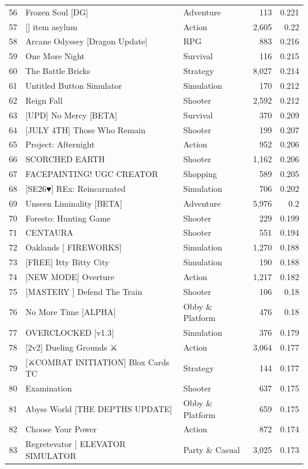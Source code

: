 \documentclass[10pt]{article}
\begin{document}
\begin{longtable}{r l l r r}
56 & Frozen Soul [DG] & Adventure & 113 & 0.221 \\
57 & [] item asylum & Action & 2,605 & 0.22 \\
58 & Arcane Odyssey [Dragon Update] & RPG & 883 & 0.216 \\
59 & One More Night & Survival & 116 & 0.215 \\
60 & The Battle Bricks & Strategy & 8,027 & 0.214 \\
61 & Untitled Button Simulator & Simulation & 170 & 0.212 \\
62 & Reign Fall & Shooter & 2,592 & 0.212 \\
63 & [UPD] No Mercy [BETA] & Survival & 370 & 0.209 \\
64 & [JULY 4TH] Those Who Remain & Shooter & 199 & 0.207 \\
65 & Project: Afternight & Action & 952 & 0.206 \\
66 & SCORCHED EARTH & Shooter & 1,162 & 0.206 \\
67 & FACEPAINTING! UGC CREATOR & Shopping & 589 & 0.205 \\
68 & [SE26♥] REx: Reincarnated & Simulation & 706 & 0.202 \\
69 & Unseen Liminality [BETA] & Adventure & 5,976 & 0.2 \\
70 & Foresto: Hunting Game & Shooter & 229 & 0.199 \\
71 & CENTAURA & Shooter & 551 & 0.194 \\
72 & Oaklands [ FIREWORKS] & Simulation & 1,270 & 0.188 \\
73 & [FREE] Itty Bitty City & Simulation & 190 & 0.188 \\
74 & [NEW MODE] Overture & Action & 1,217 & 0.182 \\
75 & [MASTERY ] Defend The Train & Shooter & 106 & 0.18 \\
76 & No More Time [ALPHA] & Obby \& Platform & 476 & 0.18 \\
77 & OVERCLOCKED [v1.3] & Simulation & 376 & 0.179 \\
78 & [2v2] Dueling Grounds ⚔ & Action & 3,064 & 0.177 \\
79 & [⚔COMBAT INITIATION] Blox Cards TC & Strategy & 144 & 0.177 \\
80 & Examination & Shooter & 637 & 0.175 \\
81 & Abyss World [THE DEPTHS UPDATE] & Obby \& Platform & 659 & 0.175 \\
82 & Choose Your Power & Action & 872 & 0.174 \\
83 & Regretevator [ ELEVATOR SIMULATOR  & Party \& Casual & 3,025 & 0.173 \\

\end{longtable}
\end{document}
